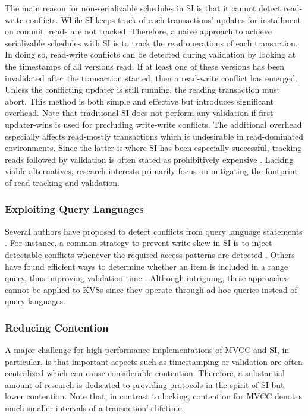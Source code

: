 The main reason for non-serializable schedules in \ac{SI} is that it cannot
detect read-write conflicts. While \ac{SI} keeps track of each transactions'
updates for installment on commit, reads are not tracked. Therefore, a naive
approach to achieve serializable schedules with \ac{SI} is to track the read
operations of each transaction. In doing so, read-write conflicts can be
detected during validation by looking at the timestamps of all versions read. If
at least one of these versions has been invalidated after the transaction
started, then a read-write conflict has emerged. Unless the conflicting updater
is still running, the reading transaction must abort. This method is both simple
and effective but introduces significant overhead. Note that traditional \ac{SI}
does not perform any validation if first-updater-wins is used for precluding
write-write conflicts. The additional overhead especially affects read-mostly
transactions which is undesirable in read-dominated environments. Since the
latter is where \ac{SI} has been especially successful, tracking reads followed
by validation is often stated as prohibitively expensive
\cite{cahill2009serializable}. Lacking viable alternatives, research interests
primarily focus on mitigating the footprint of read tracking and validation.

\subsubsection{Exploiting Query Languages}

Several authors have proposed to detect conflicts from query language statements
\cite{fekete2005making, faleiro2015rethinking, neumann2015fast}. For instance, a
common strategy to prevent write skew in \ac{SI} is to inject detectable
conflicts whenever the required access patterns are detected
\cite{fekete2005making}. Others have found efficient ways to determine whether
an item is included in a range query, thus improving validation time
\cite{neumann2015fast}. Although intriguing, these approaches cannot be applied
to \acp{KVS} since they operate through ad hoc queries instead of query
languages.

\subsubsection{Reducing Contention}

A major challenge for high-performance implementations of \ac{MVCC} and \ac{SI},
in particular, is that important aspects such as timestamping or validation are
often centralized which can cause considerable contention. Therefore, a
substantial amount of research is dedicated to providing protocols in the spirit
of \ac{SI} but lower contention. Note that, in contrast to locking, contention
for \ac{MVCC} denotes much smaller intervals of a transaction's lifetime.

